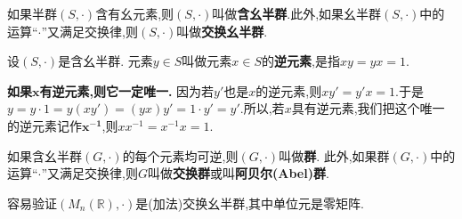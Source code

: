 \documentclass[lang=cn,newtx,10pt,scheme=chinese]{../Template/elegantbook}
\begin{document}
\begin{definition}[(交换)含幺半群定义]\label{definition:(交换)幺半群定义}
如果半群\((S,\cdot)\)含有幺元素,则\((S,\cdot)\)叫做\textbf{含幺半群}.此外,如果幺半群\((S,\cdot)\)中的运算“$\cdot$”又满足交换律,则\((S,\cdot)\)叫做\textbf{交换幺半群}.
\end{definition}

\begin{definition}
设\((S,\cdot)\)是含幺半群. 元素\(y\in S\)叫做元素\(x\in S\)的\textbf{逆元素},是指\(xy = yx = 1\).
\end{definition}
\begin{note}
\textbf{如果\(\boldsymbol{x}\)有逆元素,则它一定唯一.} 因为若\(y'\)也是\(x\)的逆元素,则\(xy' = y'x = 1\).于是$y = y\cdot 1 = y(xy') = (yx)y' = 1\cdot y' = y'.$所以,若\(x\)具有逆元素,我们把这个唯一的逆元素记作\(\boldsymbol{x^{-1}}\),则\(xx^{-1} = x^{-1}x = 1\).
\end{note}

\begin{definition}
如果含幺半群\((G,\cdot)\)的每个元素均可逆,则\((G,\cdot)\)叫做\textbf{群}. 此外,如果群\((G,\cdot)\)中的运算“$\cdot$”又满足交换律,则\(G\)叫做\textbf{交换群}或叫\textbf{阿贝尔(Abel)群}.
\end{definition}




\begin{note}
容易验证$\left( M_n\left( \mathbb{R} \right) ,\cdot \right)$是(加法)交换幺半群,其中单位元是零矩阵.
\end{note}
\end{document}

